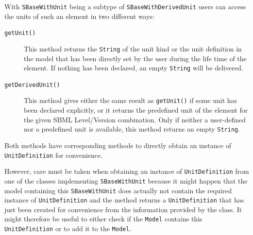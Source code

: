 \documentclass[
  BCOR12mm,
  letterpaper,
  11pt,
  headsepline,
  pointlessnumbers,
  tablecaptionabove,
  onelinecaption,
  headinclude,
  appendixprefix,
  idxtotoc,
  bibtotoc,
  twoside,
  titlepage
]{scrartcl}
\begin{document}
With \texttt{SBaseWithUnit}
 being a subtype of
\texttt{SBaseWithDerivedUnit}
users can access the units of such an element in two different ways:
\begin{description}
 \item[\texttt{getUnit()}] This method returns the
 \texttt{String}
 of the unit kind or the unit definition in the model
 that has been directly set by the user
 during the life time of the element. If nothing has been declared, an empty
 \texttt{String} will be delivered.
 \item[\texttt{getDerivedUnit()}] This method gives either the same result as
 \texttt{getUnit()} if some unit has been declared explicitly, or it returns the
 predefined unit of the element for the given SBML Level/Version combination.
 Only if neither a user-defined nor a predefined unit is available, this method
 returns an empty \texttt{String}.
\end{description}
Both methods have corresponding methods to directly obtain an instance of
\texttt{UnitDefinition}
for convenience.

However, care must be taken when obtaining an instance of
\texttt{UnitDefinition}
from one of the classes implementing \texttt{SBaseWithUnit}
because it might happen that the model containing this
\texttt{SBaseWithUnit}
does actually not contain the required instance of \texttt{UnitDefinition} and
the method returns a \texttt{UnitDefinition} that has just been created for
convenience from the information provided by the class. It might therefore be
useful to either check if the \texttt{Model}
contains this \texttt{UnitDefinition}
or to add it to the \texttt{Model}.
\end{document}
